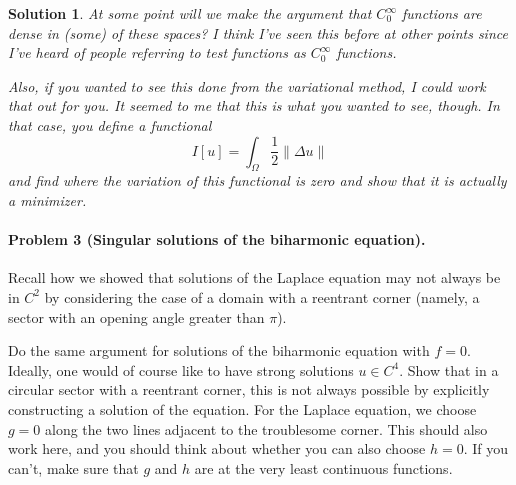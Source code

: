 \documentclass[leqno]{article}
\theoremstyle{nonumberplain}
\newtheorem{solution}{Solution}
\begin{document}
\begin{solution}
At some point will we make the argument that $C^\infty_0$ functions are dense in (some) of these spaces?  I think I've seen this before at other points since I've heard of people referring to test functions as $C^\infty_0$ functions. 

Also, if you wanted to see this done from the variational method, I could work that out for you.  It seemed to me that this is what you wanted to see, though.  In that case, you define a functional
\[
I[u] = \int_\Omega \frac{1}{2} \| \Delta u\|
\]
and find where the variation of this functional is zero and show that it is actually a minimizer.
\end{solution}
\pagebreak

\paragraph{Problem 3 (Singular solutions of the biharmonic equation).}
Recall how we showed that solutions of the Laplace equation may not
always be in $C^2$ by considering the case of a domain with a
reentrant corner (namely, a sector with an opening angle greater than
$\pi$).

Do the same argument for solutions of the biharmonic equation with
$f=0$. Ideally, one would of course like to have strong solutions
$u\in C^4$. Show that in a circular sector with a reentrant corner,
this is not always possible by explicitly constructing a solution of
the equation. For the Laplace equation, we choose $g=0$ along the two
lines adjacent to the troublesome corner. This should also work here,
and you should think about whether you can also choose $h=0$. If you
can't, make sure that $g$ and $h$ are at the very least
continuous functions.
\end{document}
